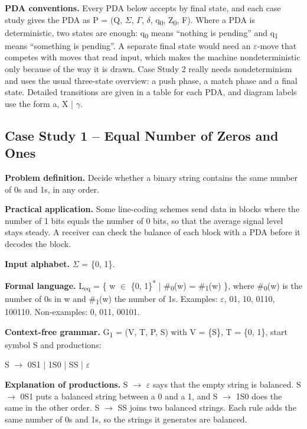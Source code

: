 \documentclass[12pt,a4paper]{article}
\begin{document}
\textbf{PDA conventions.} Every PDA below accepts by final state, and each case study gives the PDA as P = (Q, \ensuremath{\Sigma}, \ensuremath{\Gamma}, \ensuremath{\delta}, q\textsubscript{0}, Z\textsubscript{0}, F). Where a PDA is deterministic, two states are enough: q\textsubscript{0} means ``nothing is pending'' and q\textsubscript{1} means ``something is pending''. A separate final state would need an \ensuremath{\varepsilon}-move that competes with moves that read input, which makes the machine nondeterministic only because of the way it is drawn. Case Study 2 really needs nondeterminism and uses the usual three-state overview: a push phase, a match phase and a final state. Detailed transitions are given in a table for each PDA, and diagram labels use the form a, X | \ensuremath{\gamma}.

\subsection{Case Study 1 -- Equal Number of Zeros and Ones}

\textbf{Problem definition.} Decide whether a binary string contains the same number of 0s and 1s, in any order.

\textbf{Practical application.} Some line-coding schemes send data in blocks where the number of 1 bits equals the number of 0 bits, so that the average signal level stays steady. A receiver can check the balance of each block with a PDA before it decodes the block.

\textbf{Input alphabet.} \ensuremath{\Sigma} = \{0, 1\}.

\textbf{Formal language.} L\textsubscript{eq} = \{ w \ensuremath{\in} \{0, 1\}\textsuperscript{*} | \#\textsubscript{0}(w) = \#\textsubscript{1}(w) \}, where \#\textsubscript{0}(w) is the number of 0s in w and \#\textsubscript{1}(w) the number of 1s. Examples: \ensuremath{\varepsilon}, 01, 10, 0110, 100110. Non-examples: 0, 011, 00101.

\textbf{Context-free grammar.} G\textsubscript{1} = (V, T, P, S) with V = \{S\}, T = \{0, 1\}, start symbol S and productions:

\begin{center}S \ensuremath{\rightarrow} 0S1  |  1S0  |  SS  |  \ensuremath{\varepsilon}\end{center}

\textbf{Explanation of productions.} S \ensuremath{\rightarrow} \ensuremath{\varepsilon} says that the empty string is balanced. S \ensuremath{\rightarrow} 0S1 puts a balanced string between a 0 and a 1, and S \ensuremath{\rightarrow} 1S0 does the same in the other order. S \ensuremath{\rightarrow} SS joins two balanced strings. Each rule adds the same number of 0s and 1s, so the strings it generates are balanced.
\end{document}
